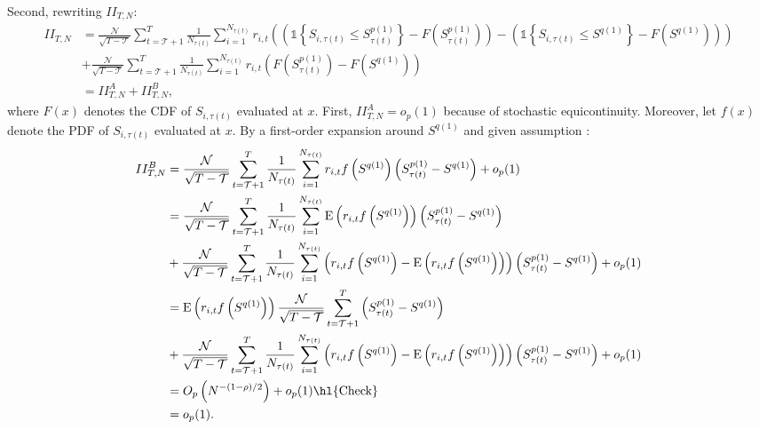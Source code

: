 Second, rewriting $II_{T,N}$: 
\begin{align*}
II_{T,N} &=\frac{\mathcal{N}}{\sqrt{T-\mathcal{T}}}\sum_{t=\mathcal{T}+1}^{T}\frac{1}{N_{\tau(t)}} \sum_{i=1}^{N_{\tau(t)}} r_{i,t} \left( \left( \mathds{1} \left\{ S_{i,\tau(t) }\leq S_{\tau(t) }^{p(1)}\right\} -F\left( S_{\tau(t) }^{p(1)}\right) \right) - \left( \mathds{1} \left\{ S_{i,\tau(t) }\leq S^{q(1)}\right\} -F\left( S^{q(1)} \right) \right) \right) \\
&+ \frac{\mathcal{N}}{\sqrt{T-\mathcal{T}}}\sum_{t=\mathcal{T}+1}^{T}\frac{1}{N_{\tau(t)}} \sum_{i=1}^{N_{\tau(t)}}r_{i,t}\left( F\left( S_{\tau(t) }^{p(1)}\right) -F\left( S^{q(1)} \right) \right) \\
&= II_{T,N}^{A} + II_{T,N}^{B},
\end{align*}
where $F\left( x \right)$ denotes the CDF of $S_{i,\tau(t) }$ evaluated at $x$. First, $II_{T,N}^{A}=o_{p}(1)$ because of stochastic equicontinuity. Moreover, let $f(x)$ denote the PDF of $S_{i,\tau(t) }$ evaluated at $x$. By a first-order expansion around $S^{q(1)}$ and given assumption :
\begin{align*}
II_{T,N}^{B} &= \frac{\mathcal{N}}{\sqrt{T-\mathcal{T}}}\sum_{t=\mathcal{T}+1}^{T}\frac{1}{N_{\tau(t)}} \sum_{i=1}^{N_{\tau(t)}} r_{i,t}f\left( S^{q(1)} \right) \left( S_{\tau(t) }^{p(1)}-S^{q(1)} \right) + o_p(1) \\
&= \frac{\mathcal{N}}{\sqrt{T-\mathcal{T}}}\sum_{t=\mathcal{T}+1}^{T}\frac{1}{N_{\tau(t)}} \sum_{i=1}^{N_{\tau(t)}} \mathrm{E} \left( r_{i,t} f\left( S^{q(1)} \right) \right)  \left( S_{\tau(t) }^{p(1)}-S^{q(1)} \right) \\
&+ \frac{\mathcal{N}}{\sqrt{T-\mathcal{T}}}\sum_{t=\mathcal{T}+1}^{T}\frac{1}{N_{\tau(t)}} \sum_{i=1}^{N_{\tau(t)}} \left( r_{i,t} f\left( S^{q(1)} \right) - \mathrm{E} \left( r_{i,t} f\left( S^{q(1)} \right) \right) \right) \left( S_{\tau(t) }^{p(1)}-S^{q(1)} \right) + o_p(1) \\
&= \mathrm{E}\left( r_{i,t} f \left( S^{q(1)} \right) \right) \frac{\mathcal{N}}{\sqrt{T-\mathcal{T}}}\sum_{t=\mathcal{T}+1}^{T} \left( S_{\tau(t) }^{p(1)}-S^{q(1)} \right) \\
&+ \frac{\mathcal{N}}{\sqrt{T-\mathcal{T}}}\sum_{t=\mathcal{T}+1}^{T}\frac{1}{N_{\tau(t)}} \sum_{i=1}^{N_{\tau(t)}} \left( r_{i,t} f\left( S^{q(1)} \right) - \mathrm{E} \left( r_{i,t} f\left( S^{q(1)} \right) \right) \right) \left( S_{\tau(t) }^{p(1)}-S^{q(1)} \right) + o_p(1) \\
&= O_{p} \left( N^{-(1-\rho)/2} \right) + o_{p}(1) \text{\hl{Check}} \\
&=o_{p}(1).
\end{align*} 

